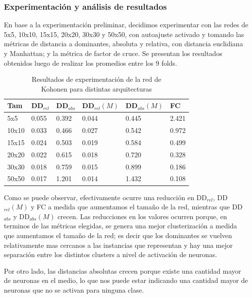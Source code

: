 \documentclass[informe.tex]{subfiles}
\begin{document}
       \subsubsection{Experimentaci\'on y an\'alisis de resultados}
       
       En base a la experimentaci\'on preliminar, decidimos experimentar con las redes de 5x5, 10x10, 15x15, 20x20, 30x30 y 50x50, con autoajuste activado y tomando las m\'etricas de distancia a dominantes, absoluta y relativa, con distancia euclidiana y Manhattan; y la m\'etrica de factor de cruce. Se presentan los resultados obtenidos luego de realizar los promedios entre los 9 folds.
       
       \begin{table}[H]
	  \centering
	  \begin{tabular}{|l|l|l|l|l|l|} \hline
	  Tam & DD$_{rel}$ & DD$_{abs}$ & DD$_{rel}(M)$ & DD$_{abs}(M)$  & FC \\ \hline
	  5x5    & 0.055 & 0.392 & 0.044 & 0.445 & 2.421 \\ \hline
	  10x10  & 0.033 & 0.466 & 0.027 & 0.542 & 0.972 \\ \hline
	  15x15  & 0.024 & 0.503 & 0.019 & 0.584 & 0.499 \\ \hline
	  20x20  & 0.022 & 0.615 & 0.018 & 0.720 & 0.328 \\ \hline
	  30x30  & 0.018 & 0.759 & 0.015 & 0.899 & 0.186 \\ \hline
	  50x50  & 0.017 & 1.201 & 0.014 & 1.432 & 0.108 \\ \hline
	  \end{tabular}
	  \caption{Resultados de experimentaci\'on de la red de \\ Kohonen para distintas arquitecturas}
	  \label{tab:resultados_kohonen}
	\end{table}
	
	Como se puede observar, efectivamente ocurre una reducci\'on en DD$_{rel}$, DD$_{rel}(M)$ y FC a medida que aumentamos el tama\~no de la red, mientras que DD$_{abs}$ y DD$_{abs}(M)$ crecen. Las reducciones en los valores ocurren porque, en terminos de las m\'etricas elegidas, se genera una mejor clusterizaci\'on a medida que aumentamos el tama\~no de la red; es decir que los dominantes se vuelven relativamente mas cercanos a las instancias que representan y hay una mejor separaci\'on entre los distintos clusters a nivel de activaci\'on de neuronas. 
	
	Por otro lado, las distancias absolutas crecen porque existe una cantidad mayor de neuronas en el medio, lo que nos puede estar indicando una cantidad mayor de neuronas que no se activan para ninguna clase.
	
\end{document}
